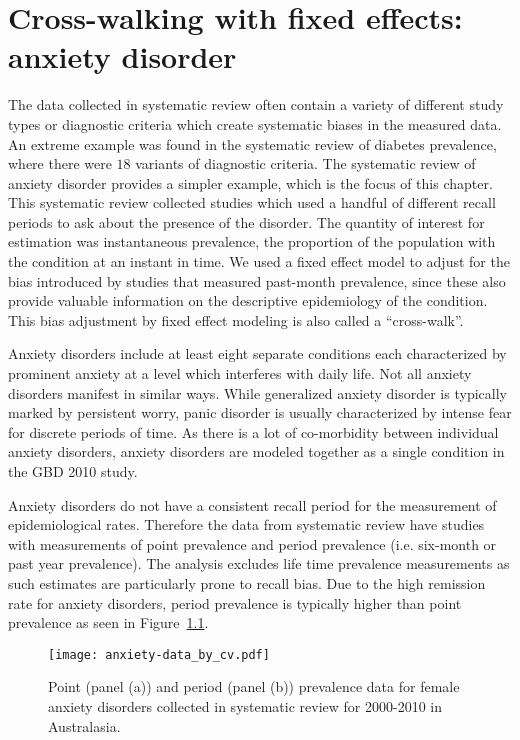 \chapter{Cross-walking with fixed effects: anxiety disorder}
\label{applications-efx_study_level}

The data collected in systematic review often contain a variety of
different study types or diagnostic criteria which create systematic
biases in the measured data.  An extreme example was found in the
systematic review of diabetes prevalence, where there were $18$ variants
of diagnostic criteria.  The systematic review of anxiety disorder
provides a simpler example, which is the focus of this chapter. This
systematic review collected studies which used a handful of different
recall periods to ask about the presence of the disorder. The quantity
of interest for estimation was instantaneous prevalence, the
proportion of the population with the condition at an instant in time.
We used a fixed effect model to adjust for the bias introduced by
studies that measured past-month prevalence, since these also provide
valuable information on the descriptive epidemiology of the condition.
This bias adjustment by fixed effect modeling is also called a
``cross-walk''.

Anxiety disorders include at least eight separate conditions each
characterized by prominent anxiety at a level which interferes with
daily life.  Not all anxiety disorders manifest in similar ways.
While generalized anxiety disorder is typically marked by persistent
worry, panic disorder is usually characterized by intense fear for
discrete periods of time. \cite{american_psychiatric_association_diagnostic_2000} As there is
a lot of co-morbidity between individual anxiety disorders, anxiety
disorders are modeled together as a single condition in the GBD 2010
study.

Anxiety disorders do not have a consistent recall period for the
measurement of epidemiological rates.  Therefore the data from
systematic review have studies with measurements of point prevalence
and period prevalence (i.e. six-month or past year prevalence).  The
analysis excludes life time prevalence measurements as such estimates are
particularly prone to recall bias.  Due to the high remission rate for
anxiety disorders, period prevalence is typically higher than point
prevalence as seen in Figure~\ref{fig:app-anxiety data}.

    \begin{figure}[h]
        \begin{center}
            \texttt{[image: anxiety-data\_by\_cv.pdf]}
            \caption{Point (panel (a)) and period (panel (b)) prevalence data
              for female anxiety disorders collected in systematic review for
              2000-2010 in Australasia.}
            \label{fig:app-anxiety data}
        \end{center}
    \end{figure}

